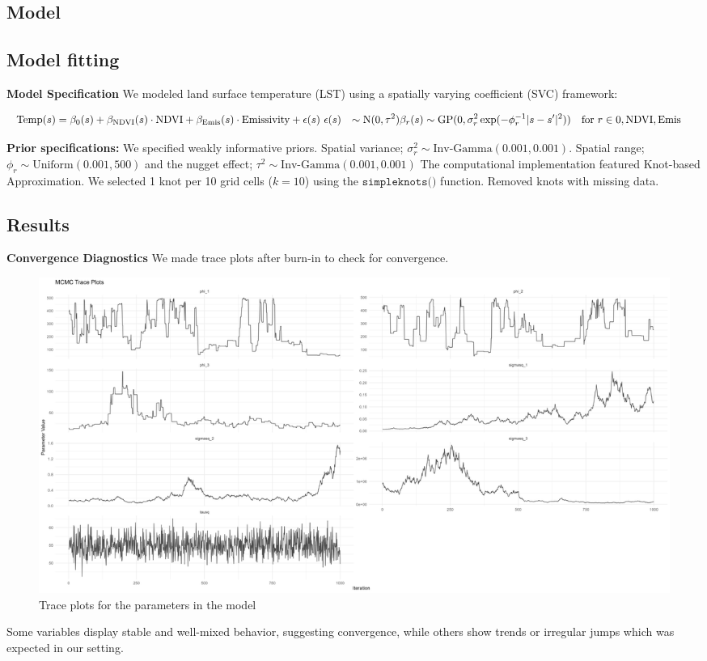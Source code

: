 \subsection{Model}

\subsection{Model fitting}
\textbf{Model Specification}\newline
We modeled land surface temperature (LST) using a spatially varying coefficient (SVC) framework:

\begin{align}
\text{Temp}(s) &= \beta_0(s) + \beta_{\text{NDVI}}(s)\cdot\text{NDVI} + \beta_{\text{Emis}}(s)\cdot\text{Emissivity} + \epsilon(s) \
\epsilon(s) &\sim \text{N}(0, \tau^2) \newline
\beta_r(s) &\sim \text{GP}(0, \sigma_r^2 \exp(-\phi_r^{-1}|s-s'|^2)) \quad \text{for } r \in {0, \text{NDVI}, \text{Emis}}
\end{align}

\textbf{Prior specifications:} We specified weakly informative priors. Spatial variance; $\sigma_r^2 \sim \text{Inv-Gamma}(0.001, 0.001)$.   Spatial range; $\phi_r \sim \text{Uniform}(0.001, 500)$ and  the nugget effect; $\tau^2 \sim \text{Inv-Gamma}(0.001, 0.001)$ \newline
The computational implementation featured Knot-based Approximation. We selected 1 knot per 10 grid cells ($k=10$) using the  $\texttt{simpleknots()}$ function. Removed knots with missing data.
\subsection{Results}
\textbf{Convergence Diagnostics}\newline
We made trace plots after burn-in to check for convergence. 

\begin{figure}[h]
 \centering
 \includegraphics[width=\textwidth]{../../figures/traceplots.png}
 \caption{Trace plots for the parameters in the model}
 \label{fig:traceplots}
 \end{figure}
Some variables display stable and well-mixed behavior, suggesting convergence, while others show trends or irregular jumps which was expected in our setting.

